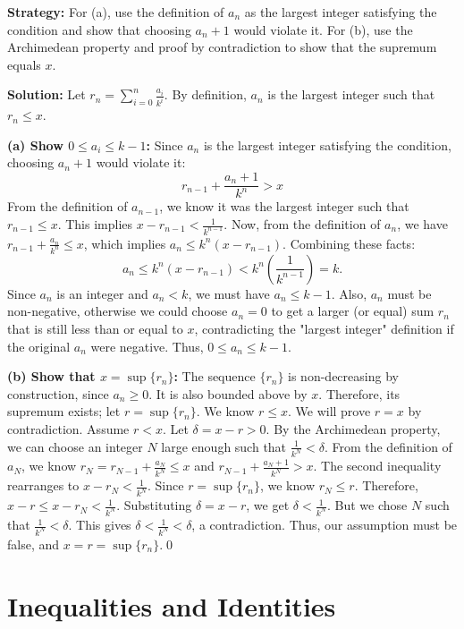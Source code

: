 \noindent\textbf{Strategy:} For (a), use the definition of $a_n$ as the largest integer satisfying the condition and show that choosing $a_n + 1$ would violate it. For (b), use the Archimedean property and proof by contradiction to show that the supremum equals $x$.

\bigskip\noindent\textbf{Solution:}
Let \( r_n = \sum_{i=0}^n \frac{a_i}{k^i} \). By definition, \( a_n \) is the largest integer such that \( r_n \leq x \).

\textbf{(a) Show \( 0 \leq a_i \leq k - 1 \):}
Since \( a_n \) is the largest integer satisfying the condition, choosing \( a_n + 1 \) would violate it:
\[
r_{n-1} + \frac{a_n + 1}{k^n} > x
\]
From the definition of \(a_{n-1}\), we know it was the largest integer such that \( r_{n-1} \le x \). This implies $x - r_{n-1} < \frac{1}{k^{n-1}}$.
Now, from the definition of $a_n$, we have $r_{n-1} + \frac{a_n}{k^n} \leq x$, which implies $a_n \leq k^n(x - r_{n-1})$.
Combining these facts:
\[
a_n \leq k^n(x - r_{n-1}) < k^n\left(\frac{1}{k^{n-1}}\right) = k.
\]
Since $a_n$ is an integer and $a_n < k$, we must have $a_n \leq k-1$. Also, $a_n$ must be non-negative, otherwise we could choose $a_n=0$ to get a larger (or equal) sum $r_n$ that is still less than or equal to $x$, contradicting the "largest integer" definition if the original $a_n$ were negative. Thus, $0 \leq a_n \leq k-1$.

\textbf{(b) Show that \( x = \sup \{ r_n \} \):}
The sequence $\{r_n\}$ is non-decreasing by construction, since $a_n \ge 0$. It is also bounded above by $x$. Therefore, its supremum exists; let $r = \sup\{r_n\}$. We know $r \le x$.
We will prove $r=x$ by contradiction. Assume $r < x$. Let $\delta = x - r > 0$.
By the Archimedean property, we can choose an integer $N$ large enough such that $\frac{1}{k^N} < \delta$.
From the definition of $a_N$, we know $r_N = r_{N-1} + \frac{a_N}{k^N} \le x$ and $r_{N-1} + \frac{a_N+1}{k^N} > x$.
The second inequality rearranges to $x - r_N < \frac{1}{k^N}$.
Since $r = \sup\{r_n\}$, we know $r_N \leq r$.
Therefore, $x - r \leq x - r_N < \frac{1}{k^N}$.
Substituting $\delta = x-r$, we get $\delta < \frac{1}{k^N}$.
But we chose $N$ such that $\frac{1}{k^N} < \delta$. This gives $\delta < \frac{1}{k^N} < \delta$, a contradiction.
Thus, our assumption must be false, and $x = r = \sup\{r_n\}$.\qed
\section{Inequalities and Identities}

